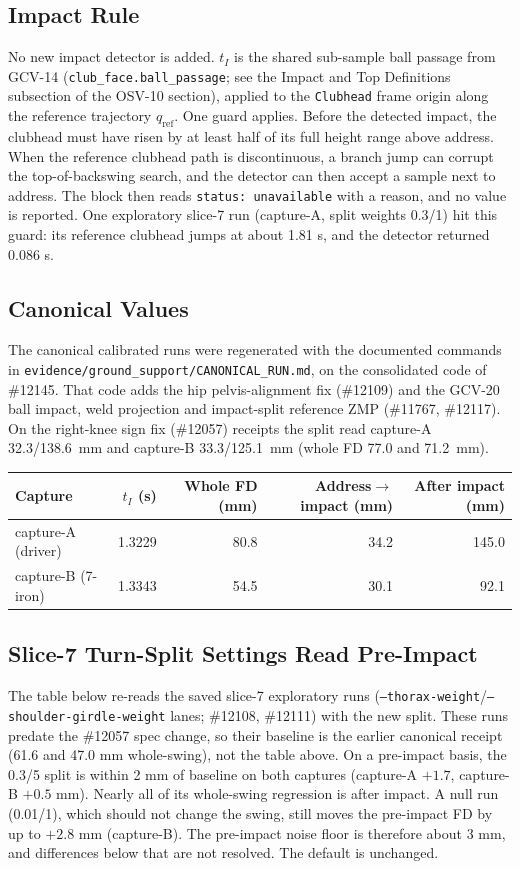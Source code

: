 \documentclass[11pt,a4paper]{article}
\begin{document}
\subsection{Impact Rule}
No new impact detector is added. $t_I$ is the shared sub-sample ball passage
from GCV-14 (\texttt{club\_face.ball\_passage}; see the Impact and Top
Definitions subsection of the OSV-10 section), applied to the
\texttt{Clubhead} frame origin along the reference trajectory $q_\mathrm{ref}$.
One guard applies. Before the detected impact, the clubhead must have risen
by at least half of its full height range above address. When the reference
clubhead path is discontinuous, a branch jump can corrupt the top-of-backswing
search, and the detector can then accept a sample next to address. The block
then reads \texttt{status: unavailable} with a reason, and no value is
reported. One exploratory slice-7 run (capture-A, split weights 0.3/1) hit
this guard: its reference clubhead jumps at about 1.81 s, and the detector
returned 0.086 s.

\subsection{Canonical Values}
The canonical calibrated runs were regenerated with the documented commands
in \texttt{evidence/ground\_support/CANONICAL\_RUN.md}, on the consolidated
code of \#12145. That code adds the hip pelvis-alignment fix (\#12109) and the
GCV-20 ball impact, weld projection and impact-split reference ZMP (\#11767,
\#12117). On the right-knee sign fix (\#12057) receipts the split read
capture-A 32.3/138.6~mm and capture-B 33.3/125.1~mm (whole FD 77.0 and
71.2~mm).

\begin{center}
\begin{tabular}{lrrrr}
\hline
Capture & $t_I$ (s) & Whole FD (mm) & Address$\to$impact (mm) & After impact (mm) \\
\hline
capture-A (driver) & 1.3229 & 80.8 & 34.2 & 145.0 \\
capture-B (7-iron) & 1.3343 & 54.5 & 30.1 & 92.1 \\
\hline
\end{tabular}
\end{center}

\subsection{Slice-7 Turn-Split Settings Read Pre-Impact}
The table below re-reads the saved slice-7 exploratory runs
(\texttt{--thorax-weight}/\texttt{--shoulder-girdle-weight} lanes; \#12108,
\#12111) with the new split. These runs predate the \#12057 spec change, so their
baseline is the earlier canonical receipt (61.6 and 47.0 mm whole-swing), not
the table above. On a pre-impact basis, the 0.3/5 split is within
2 mm of baseline on both captures (capture-A $+1.7$, capture-B $+0.5$ mm).
Nearly all of its whole-swing regression is after impact. A null run (0.01/1),
which should not change the swing, still moves the pre-impact FD by up to
$+2.8$ mm (capture-B). The pre-impact noise floor is therefore about 3 mm,
and differences below that are not resolved. The default is unchanged.
\end{document}
